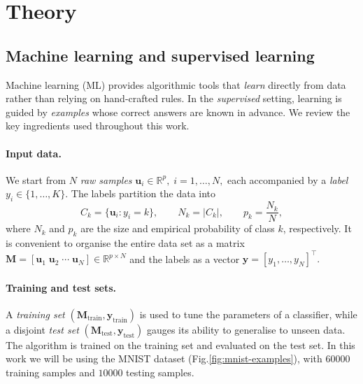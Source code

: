 \documentclass[twocolumn]{article} %
\begin{document}
\section{Theory}

\subsection{Machine learning and supervised learning}

\label{subsec:ml}

Machine learning (ML) provides algorithmic tools that \emph{learn}
directly from data rather than relying on hand-crafted rules.
In the \emph{supervised} setting, learning is guided by \emph{examples}
whose correct answers are known in advance.  We review the key
ingredients used throughout this work.

\paragraph{Input data.}
We start from $N$ \emph{raw samples}
\(
\mathbf u_i\in\mathbb R^{p},\; i=1,\dots,N,
\)
each accompanied by a \emph{label}
\(
y_i\in\{1,\dots,K\}.
\)
The labels partition the data into
\[
C_k=\{\mathbf u_i: y_i=k\},
\qquad
N_k=|C_k|,
\qquad
p_k=\frac{N_k}{N},
\]
where $N_k$ and $p_k$ are the size and empirical probability of class
$k$, respectively.  It is convenient to organise the entire data set as
a matrix
$
\mathbf M=[\mathbf u_1\;\mathbf u_2\;\cdots\;\mathbf u_N]\in\mathbb R^{p\times N}
$
and the labels as a vector
$
\mathbf y=[y_1,\dots,y_N]^{\!\top}\!.
$

\paragraph{Training and test sets.}
A \emph{training set}
$(\mathbf M_{\text{train}},\mathbf y_{\text{train}})$
is used to tune the parameters of a classifier, while a disjoint
\emph{test set}
$(\mathbf M_{\text{test}},\mathbf y_{\text{test}})$
gauges its ability to generalise to unseen data. 
The algorithm is trained on the training set and evaluated on the test set. In this work we will be using the MNIST dataset (Fig.\ref{fig:mnist-examples}), with $60000$ training samples and $10000$ testing samples.
\end{document}
